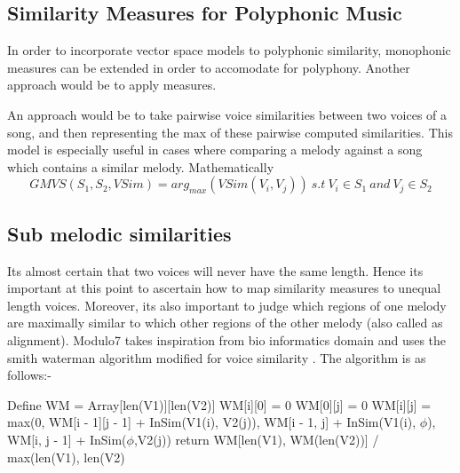 \subsection{Similarity Measures for Polyphonic Music} \label{polyphonicsim}

\noindent In order to incorporate vector space models to polyphonic similarity, monophonic measures can be extended in order to accomodate for polyphony. Another approach would be to apply measures.

 An approach would be to take pairwise voice similarities between two voices of a song, and then representing the max of these pairwise computed similarities. This model is especially useful in cases where comparing a melody against a song which contains a similar melody. Mathematically 
\begin{equation}
GMVS(S_1, S_2, VSim) = arg_{max} (VSim(V_i, V_j)) \ s.t \ V_i \in S_1 \ and \ V_j \in S_2
\end{equation}

\subsection{Sub melodic similarities} \label{sim:unequal}

\noindent Its almost certain that two voices will never have the same length. Hence its important at this point to ascertain how to map similarity measures to unequal length voices. Moreover, its also important to judge which regions of one melody are maximally similar to which other regions of the other melody (also called as alignment). Modulo7 takes inspiration from bio informatics domain and uses the smith waterman algorithm modified for voice similarity \cite{smithWatermanBook}. The algorithm is as follows:-

\begin{algorithm}

\label{SMAlgorithm}
\begin{algorithmic}[1]
 {}
\State Define WM = Array[len(V1)][len(V2)]
\State WM[i][0] = 0
\EndFor
{}
\State WM[0][j] = 0
\EndFor
{}
\State WM[i][j] = max(0, WM[i - 1][j - 1] + InSim(V1(i), V2(j)), WM[i - 1, j] + InSim(V1(i), $\phi$), WM[i, j - 1] + InSim($\phi$,V2(j))
\EndFor
\EndFor
\State return WM[len(V1), WM(len(V2))] / max(len(V1), len(V2)
\EndProcedure
\end{algorithmic}
\end{algorithm}


